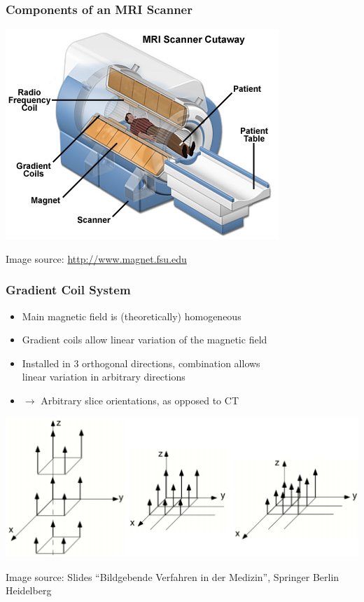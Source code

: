 \begin{frame}
	\frametitle{Components of an MRI Scanner}
	
	\begin{center}
		\includegraphics[height=0.8\textheight]{images/mri_scanner}
	\end{center}
	
	{\flushright
	\tiny Image source: \url{http://www.magnet.fsu.edu}}
\end{frame}

\begin{frame}
	\frametitle{Gradient Coil System}
	
	\begin{itemize}
		\item Main magnetic field  is (theoretically) homogeneous
		\item Gradient coils allow linear variation of the magnetic field
		\item Installed in 3 orthogonal directions, combination allows \\ linear variation in arbitrary directions
		\item $\rightarrow$ Arbitrary slice orientations, as opposed to CT
	\end{itemize}
	
	\begin{center}
		\includegraphics[height=0.4\textheight]{images/gradients}
		
		{\scriptsize Image source: Slides ``Bildgebende Verfahren in der Medizin'', Springer Berlin Heidelberg}
	\end{center}
	
\end{frame}

